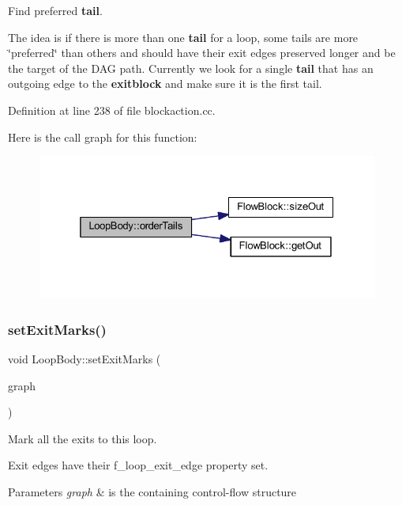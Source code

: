 Find preferred {\bfseries{tail}}. 

The idea is if there is more than one {\bfseries{tail}} for a loop, some tails are more \char`\"{}preferred\char`\"{} than others and should have their exit edges preserved longer and be the target of the D\+AG path. Currently we look for a single {\bfseries{tail}} that has an outgoing edge to the {\bfseries{exitblock}} and make sure it is the first tail. 

Definition at line 238 of file blockaction.\+cc.

Here is the call graph for this function\+:
\nopagebreak
\begin{figure}[H]
\begin{center}
\leavevmode
\includegraphics[width=325pt]{class_loop_body_a43635dafd8293567ca13c10be0aead6f_cgraph}
\end{center}
\end{figure}
\mbox{\label{class_loop_body_a24f6fd993c0e4fe0684f9fa4446e9e9c}} 
\subsubsection{\texorpdfstring{setExitMarks()}{setExitMarks()}}
{\footnotesize\ttfamily void Loop\+Body\+::set\+Exit\+Marks (\begin{DoxyParamCaption}\item[{\mbox{\hyperlink{class_flow_block}{Flow\+Block}} $\ast$}]{graph }\end{DoxyParamCaption})}



Mark all the exits to this loop. 

Exit edges have their f\+\_\+loop\+\_\+exit\+\_\+edge property set. 
\begin{DoxyParams}{Parameters}
{\em graph} & is the containing control-\/flow structure \\
\hline
\end{DoxyParams}


